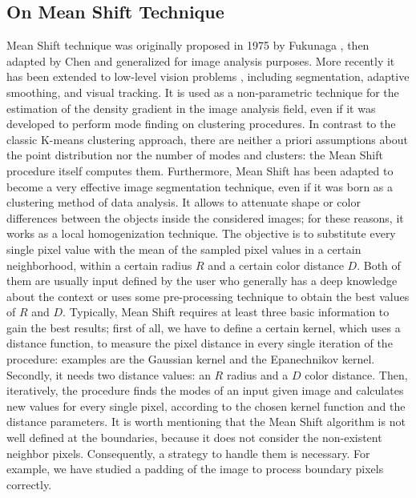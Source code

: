 \documentclass[final,a4paper,12pt,english]{UnicaPhdThesis3}
\begin{document}
{\subsection{On Mean Shift Technique}
Mean Shift technique was originally proposed in 1975 by Fukunaga \cite{fukunaga}, then adapted by Chen \cite{Pan} and generalized for image analysis purposes. More recently it has been extended to low-level vision problems \cite{Foran}, including segmentation, adaptive smoothing, and visual tracking. It is used as a non-parametric technique for the estimation of the density gradient in the image analysis field, even if it was developed to perform mode finding on clustering procedures. In contrast to the classic K-means clustering approach, there are neither a priori assumptions about the point distribution nor the number of modes and clusters: the Mean Shift procedure itself computes them. Furthermore, Mean Shift has been adapted to become a very effective image segmentation technique, even if it was born as a clustering method of data analysis. It allows to attenuate shape or color differences between the objects inside the considered images; for these reasons, it works as a local homogenization technique. The objective is to substitute every single pixel value with the mean of the sampled pixel values in a certain neighborhood, within a certain radius $R$ and a certain color distance $D$. Both of them are usually input defined by the user who generally has a deep knowledge about the context or uses some pre-processing technique to obtain the best values of $R$ and $D$. Typically, Mean Shift requires at least three basic information to gain the best results; first of all, we have to define a certain kernel, which uses a distance function, to measure the pixel distance in every single iteration of the procedure: examples are the Gaussian kernel and the Epanechnikov kernel. Secondly, it needs two distance values: an $R$ radius and a $D$ color distance. Then, iteratively, the procedure finds the modes of an input given image and calculates new values for every single pixel, according to the chosen kernel function and the distance parameters. It is worth mentioning that the Mean Shift algorithm is not well defined at the boundaries, because it does not consider the non-existent neighbor pixels. Consequently, a strategy to handle them is necessary. For example, we have studied a padding of the image to process boundary pixels correctly.

}
\end{document}
